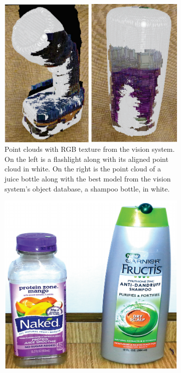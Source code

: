 \begin{figure}
\begin{subfigure}[b]{\columnwidth}
\centering
\includegraphics[height=0.2\textheight]{alignment_1.png}
\caption{Point clouds with RGB texture from the vision system. On the left is a flashlight along with its aligned point cloud in white. On the right is the point cloud of a juice bottle along with the best model from the vision system’s object database, a shampoo bottle, in white.}
\label{fig:alignment_1}
\end{subfigure}
\begin{subfigure}[b]{\columnwidth}
\centering
\includegraphics[height=0.2\textheight]{unknown_objects_1.png}

\end{subfigure}
\end{figure}
